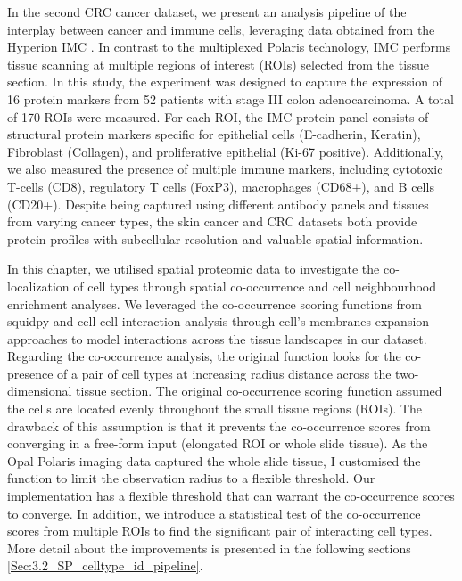 In the second CRC cancer dataset, we present an analysis pipeline of the interplay between cancer and immune cells, leveraging data obtained from the Hyperion IMC \cite{giesen2014IMC}. In contrast to the multiplexed Polaris technology, IMC performs tissue scanning at multiple regions of interest (ROIs) selected from the tissue section. In this study, the experiment was designed to capture the expression of 16 protein markers from 52 patients with stage III colon adenocarcinoma. A total of 170 ROIs were measured. For each ROI, the IMC protein panel consists of structural protein markers specific for epithelial cells (E-cadherin, Keratin), Fibroblast (Collagen), and proliferative epithelial (Ki-67 positive). Additionally, we also measured the presence of multiple immune markers, including cytotoxic T-cells (CD8), regulatory T cells (FoxP3), macrophages (CD68+), and B cells (CD20+). Despite being captured using different antibody panels and tissues from varying cancer types, the skin cancer and CRC datasets both provide protein profiles with subcellular resolution and valuable spatial information.

In this chapter, we utilised spatial proteomic data to investigate the co-localization of cell types through spatial co-occurrence and cell neighbourhood enrichment analyses. We leveraged the co-occurrence scoring functions from squidpy \cite{palla2022squidpy} and cell-cell interaction analysis through cell's membranes expansion approaches \cite{schapiro2017histocat} to model interactions across the tissue landscapes in our dataset. Regarding the co-occurrence analysis, the original function looks for the co-presence of a pair of cell types at increasing radius distance across the two-dimensional tissue section. The original co-occurrence scoring function assumed the cells are located evenly throughout the small tissue regions (\ie ROIs). The drawback of this assumption is that it prevents the co-occurrence scores from converging in a free-form input (\ie elongated ROI or whole slide tissue). As the Opal Polaris imaging data captured the whole slide tissue, I customised the function to limit the observation radius to a flexible threshold. Our implementation has a flexible threshold that can warrant the co-occurrence scores to converge. In addition, we introduce a statistical test of the co-occurrence scores from multiple ROIs to find the significant pair of interacting cell types. More detail about the improvements is presented in the following sections \ref{Sec:3.2_SP_celltype_id_pipeline}.

